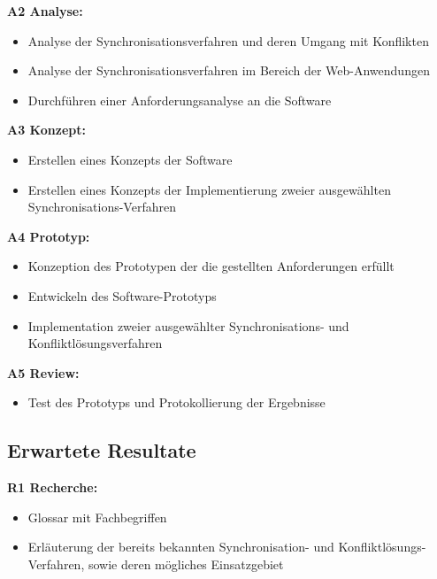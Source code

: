\documentclass[oneside,11pt,parskip=half,ngerman]{scrreprt}
\begin{document}
\textbf{A2 Analyse:}

\begin{itemize}
\itemsep1pt\parskip0pt
\item
  Analyse der Synchronisationsverfahren und deren Umgang mit Konflikten
\item
  Analyse der Synchronisationsverfahren im Bereich der Web-Anwendungen
\item
  Durchführen einer Anforderungsanalyse an die Software
\end{itemize}

\textbf{A3 Konzept:}

\begin{itemize}
\itemsep1pt\parskip0pt
\item
  Erstellen eines Konzepts der Software
\item
  Erstellen eines Konzepts der Implementierung zweier ausgewählten
  Synchronisations-Verfahren
\end{itemize}

\textbf{A4 Prototyp:}

\begin{itemize}
\itemsep1pt\parskip0pt
\item
  Konzeption des Prototypen der die gestellten Anforderungen erfüllt
\item
  Entwickeln des Software-Prototyps
\item
  Implementation zweier ausgewählter Synchronisations- und
  Konfliktlösungsverfahren
\end{itemize}

\textbf{A5 Review:}

\begin{itemize}
\itemsep1pt\parskip0pt
\item
  Test des Prototyps und Protokollierung der Ergebnisse
\end{itemize}

\subsection{Erwartete Resultate}\label{erwartete-resultate}

\textbf{R1 Recherche:}

\begin{itemize}
\itemsep1pt\parskip0pt
\item
  Glossar mit Fachbegriffen
\item
  Erläuterung der bereits bekannten Synchronisation- und
  Konfliktlösungs-Verfahren, sowie deren mögliches Einsatzgebiet
\end{itemize}
\end{document}
